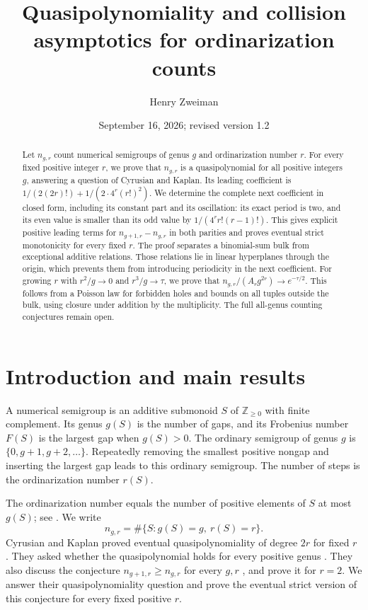 \documentclass[11pt]{article}
\title{Quasipolynomiality and collision asymptotics for ordinarization counts}
\author{Henry Zweiman}
\date{September 16, 2026; revised version 1.2}
\theoremstyle{remark}\newtheorem{remark}[theorem]{Remark}
\newcommand{\Z}{\mathbb Z}
\begin{document}
\maketitle
\begin{abstract}
Let $n_{g,r}$ count numerical semigroups of genus $g$ and ordinarization number $r$. For every fixed positive integer $r$, we prove that $n_{g,r}$ is a quasipolynomial for all positive integers $g$, answering a question of Cyrusian and Kaplan. Its leading coefficient is
$1/(2(2r)!)+1/(2\cdot4^r(r!)^2)$.
We determine the complete next coefficient in closed form, including its constant part and its oscillation: its exact period is two, and its even value is smaller than its odd value by $1/(4^r r!(r-1)!)$. This gives explicit positive leading terms for $n_{g+1,r}-n_{g,r}$ in both parities and proves eventual strict monotonicity for every fixed $r$. The proof separates a binomial-sum bulk from exceptional additive relations. Those relations lie in linear hyperplanes through the origin, which prevents them from introducing periodicity in the next coefficient. For growing $r$ with $r^2/g\to0$ and $r^3/g\to\tau$, we prove that $n_{g,r}/(A_rg^{2r})\to e^{-\tau/2}$. This follows from a Poisson law for forbidden holes and bounds on all tuples outside the bulk, using closure under addition by the multiplicity. The full all-genus counting conjectures remain open.
\end{abstract}

\section{Introduction and main results}
A numerical semigroup is an additive submonoid $S$ of $\Z_{\ge0}$ with finite complement. Its genus $g(S)$ is the number of gaps, and its Frobenius number $F(S)$ is the largest gap when $g(S)>0$. The ordinary semigroup of genus $g$ is $\{0,g+1,g+2,\ldots\}$. Repeatedly removing the smallest positive nongap and inserting the largest gap leads to this ordinary semigroup. The number of steps is the ordinarization number $r(S)$.

The ordinarization number equals the number of positive elements of $S$ at most $g(S)$; see \cite[Proposition 1.4]{CK}. We write
\[
 n_{g,r}=\#\{S:g(S)=g,\ r(S)=r\}.
\]
Cyrusian and Kaplan proved eventual quasipolynomiality of degree $2r$ for fixed $r$ \cite[Theorem 3.4]{CK}. They asked whether the quasipolynomial holds for every positive genus \cite[Remark 3.7]{CK}. They also discuss the conjecture $n_{g+1,r}\ge n_{g,r}$ for every $g,r$ \cite[Conjecture 1.5]{CK}, and prove it for $r=2$. We answer their quasipolynomiality question and prove the eventual strict version of this conjecture for every fixed positive $r$.
\end{document}
